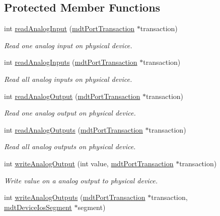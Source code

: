 \subsection*{Protected Member Functions}
\begin{DoxyCompactItemize}
\item 
int \hyperlink{classmdt_device_modbus_aa2a024793ae2a5e81c7e92260a70cd9e}{read\-Analog\-Input} (\hyperlink{classmdt_port_transaction}{mdt\-Port\-Transaction} $\ast$transaction)
\begin{DoxyCompactList}\small\item\em Read one analog input on physical device. \end{DoxyCompactList}\item 
int \hyperlink{classmdt_device_modbus_a846af6dbf80bbf747f3f966420ef6f92}{read\-Analog\-Inputs} (\hyperlink{classmdt_port_transaction}{mdt\-Port\-Transaction} $\ast$transaction)
\begin{DoxyCompactList}\small\item\em Read all analog inputs on physical device. \end{DoxyCompactList}\item 
int \hyperlink{classmdt_device_modbus_a30c815cbe5e603e8114dcbc09849e322}{read\-Analog\-Output} (\hyperlink{classmdt_port_transaction}{mdt\-Port\-Transaction} $\ast$transaction)
\begin{DoxyCompactList}\small\item\em Read one analog output on physical device. \end{DoxyCompactList}\item 
int \hyperlink{classmdt_device_modbus_ae02dd44f1d873fcc15ff75d781b62b0b}{read\-Analog\-Outputs} (\hyperlink{classmdt_port_transaction}{mdt\-Port\-Transaction} $\ast$transaction)
\begin{DoxyCompactList}\small\item\em Read all analog outputs on physical device. \end{DoxyCompactList}\item 
int \hyperlink{classmdt_device_modbus_ac63297a31205759622f341525c34251f}{write\-Analog\-Output} (int value, \hyperlink{classmdt_port_transaction}{mdt\-Port\-Transaction} $\ast$transaction)
\begin{DoxyCompactList}\small\item\em Write value on a analog output to physical device. \end{DoxyCompactList}\item 
int \hyperlink{classmdt_device_modbus_aa09d1682bef4bbc08b59b20110e613ff}{write\-Analog\-Outputs} (\hyperlink{classmdt_port_transaction}{mdt\-Port\-Transaction} $\ast$transaction, \hyperlink{classmdt_device_ios_segment}{mdt\-Device\-Ios\-Segment} $\ast$segment)

\end{DoxyCompactItemize}

